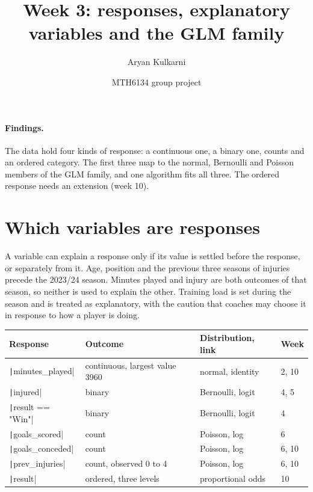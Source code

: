 \documentclass[12pt,notitlepage]{report}
\title{Week 3: responses, explanatory variables and the GLM family}
\author{Aryan Kulkarni}
\date{MTH6134 group project}
\begin{document}
\maketitle

\paragraph{Findings.}
The data hold four kinds of response: a continuous one, a binary one, counts
and an ordered category. The first three map to the normal, Bernoulli and
Poisson members of the GLM family, and one algorithm fits all three. The
ordered response needs an extension (week 10).

\section{Which variables are responses}

A variable can explain a response only if its value is settled before the
response, or separately from it. Age, position and the previous three seasons
of injuries precede the 2023/24 season. Minutes played and injury are both
outcomes of that season, so neither is used to explain the other. Training
load is set during the season and is treated as explanatory, with the caution
that coaches may choose it in response to how a player is doing.

\begin{center}
  \small
  \begin{tabular}{llll}
    \toprule
    Response & Outcome & Distribution, link & Week \\
    \midrule
    \texttt|minutes_played| & continuous, largest value 3960 & normal, identity & 2, 10 \\
    \texttt|injured| & binary & Bernoulli, logit & 4, 5 \\
    \texttt|result == "Win"| & binary & Bernoulli, logit & 4 \\
    \texttt|goals_scored| & count & Poisson, log & 6 \\
    \texttt|goals_conceded| & count & Poisson, log & 6, 10 \\
    \texttt|prev_injuries| & count, observed 0 to 4 & Poisson, log & 6, 10 \\
    \texttt|result| & ordered, three levels & proportional odds & 10 \\
    \bottomrule
  \end{tabular}
\end{center}
\end{document}
